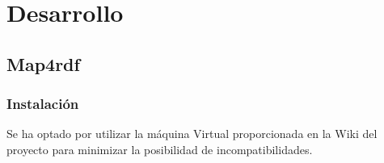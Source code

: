 \chapter{Desarrollo}

\section{Map4rdf}
\subsection{Instalación}

Se ha optado por utilizar la máquina Virtual proporcionada en la Wiki del proyecto para minimizar la posibilidad
de incompatibilidades.

